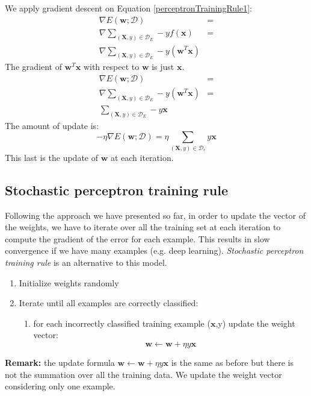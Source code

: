 We apply gradient descent on Equation \ref{perceptronTrainingRule1}:
\begin{align*}
	\nabla E(\pmb{w};\mathcal{D})                                      & = \\
	\nabla \sum_{(\pmb{X}, y) \in \mathcal{D}_E}-y f(\pmb{x})          & = \\
	\nabla \sum_{(\pmb{X}, y) \in \mathcal{D}_E}-y (\pmb{w}^{T}\pmb{x})
\end{align*}
The gradient of $\pmb{w}^{T}\pmb{x}$ with respect to $\pmb{w}$ is just $\pmb{x}$.
\begin{align*}
	\nabla E(\pmb{w};\mathcal{D})                                       & = \\
	\nabla \sum_{(\pmb{X}, y) \in \mathcal{D}_E}-y (\pmb{w}^{T}\pmb{x}) & = \\
	\sum_{(\pmb{X}, y) \in \mathcal{D}_E}-y \pmb{x}
\end{align*}
The amount of update is:
\[
	- \eta \nabla E(\pmb{w}; \mathcal{D}) = \eta \sum_{(\pmb{X},y) \in \mathcal{D}_e}
	y \pmb{x}
\]
This last is the update of $\pmb{w}$ at each iteration.

\subsection{Stochastic perceptron training rule}
Following the approach we have presented so far, in order to update the vector of
the weights, we have to iterate over all the training set at each iteration to
compute the gradient of the error for each example. This results in slow convergence
if we have many examples (e.g. deep learning). \textit{Stochastic perceptron
training rule} is an alternative to this model.

\begin{enumerate}
	\item Initialize weights randomly

	\item Iterate until all examples are correctly classified:
		\begin{enumerate}
			\item for each incorrectly classified training example ($\pmb{x}$,y) update
				the weight vector:
				\[
					\pmb{w}\leftarrow \pmb{w}+\eta y \pmb{x}
				\]
		\end{enumerate}
\end{enumerate}

\textbf{Remark:} the update formula $\pmb{w}\leftarrow \pmb{w}+\eta y \pmb{x}$
is the same as before but there is not the summation over all the training data.
We update the weight vector considering only one example.
\newline

